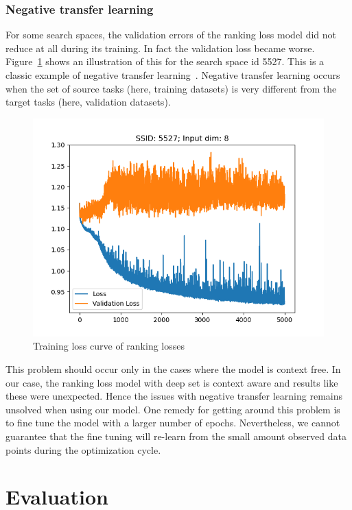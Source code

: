 \documentclass[12pt, twoside, ngerman]{report}
\begin{document}
\subsubsection{Negative transfer learning}
For some search spaces,  the validation errors of the ranking loss model did not reduce at all during its training.
In fact the validation loss became worse.
Figure~\ref{fig:NegativeLearning} shows an illustration of this for the search space id 5527.
This is a classic example of negative transfer learning~\cite{Weiss2016}.
Negative transfer learning occurs when the set of source tasks (here,  training datasets) is very different from the target tasks (here, validation datasets).

\begin{figure}[htb]
  \centering
    \includegraphics[scale=0.5]{images/NegativeLearning}
    \caption{Training loss curve of ranking losses}
    \label{fig:NegativeLearning}
\end{figure}

This problem should occur only in the cases where the model is context free.
In our case,  the ranking loss model with deep set is context aware and results like these were unexpected.
Hence the issues with negative transfer learning remains unsolved when using our model.
One remedy for getting around this problem is to fine tune the model with a larger number of epochs.
Nevertheless,  we cannot guarantee that the fine tuning will re-learn from the small amount observed data points during the optimization cycle.

\iffalse
\section{Evaluation}
\end{document}
